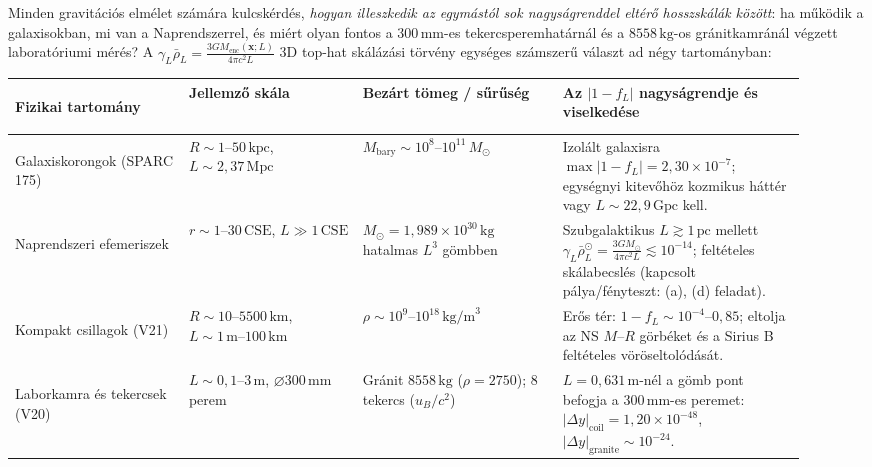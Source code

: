 \documentclass[10pt,a4paper]{article}
\begin{document}
\par
Minden gravit\'aci\'os elm\'elet sz\'am\'ara kulcsk\'erd\'es, \emph{hogyan illeszkedik az egym\'ast\'ol sok nagys\'agrenddel elt\'er\H{o} hosszsk\'al\'ak k\"oz\"ott}: ha m\H{u}k\"odik a galaxisokban, mi van a Naprendszerrel, \'es mi\'ert olyan fontos a $300\,\text{mm}$-es tekercsperemhat\'arn\'al \'es a $8558\,\text{kg}$-os gr\'anitkamr\'an\'al v\'egzett laborat\'oriumi m\'er\'es? A $\gamma_L \bar{\rho}_L = \frac{3 G M_{\text{enc}}(\mathbf{x};L)}{4\pi c^2 L}$ 3D top-hat sk\'al\'az\'asi t\"orv\'eny egys\'eges sz\'amszer\H{u} v\'alaszt ad n\'egy tartom\'anyban:
\begin{center}\vspace{-2pt}
{\footnotesize
\begin{tabular}{@{}>{\bfseries\raggedright\arraybackslash}p{0.20\linewidth}>{\raggedright\arraybackslash}p{0.20\linewidth}>{\raggedright\arraybackslash}p{0.23\linewidth}>{\raggedright\arraybackslash}p{0.29\linewidth}@{}}
\toprule
Fizikai tartom\'any & Jellemz\H{o} sk\'ala & Bez\'art t\"omeg / s\H{u}r\H{u}s\'eg & Az $|1 - f_L|$ nagys\'agrendje \'es viselked\'ese \\
\midrule
Galaxiskorongok (SPARC 175) & $R \sim 1\text{--}50\,\text{kpc}$, $L \sim 2{,}37\,\text{Mpc}$ & $M_{\text{bary}} \sim 10^8\text{--}10^{11}\,M_\odot$ & Izol\'alt galaxisra $\max|1-f_L| = 2{,}30\times 10^{-7}$; egys\'egnyi kitev\H{o}h\"oz kozmikus h\'att\'er vagy $L\sim 22{,}9\,\text{Gpc}$ kell. \\
Naprendszeri efemeriszek & $r \sim 1\text{--}30\,\text{CSE}$, $L \gg 1\,\text{CSE}$ & $M_\odot = 1{,}989\times 10^{30}\,\text{kg}$ hatalmas $L^3$ g\"ombben & Szubgalaktikus $L \gtrsim 1\,\text{pc}$ mellett $\gamma_L\bar{\rho}_L^\odot = \frac{3GM_\odot}{4\pi c^2 L} \lesssim 10^{-14}$; felt\'eteles sk\'alabecsl\'es (kapcsolt p\'alya/f\'enyteszt: (a), (d) feladat). \\
Kompakt csillagok (V21) & $R \sim 10\text{--}5500\,\text{km}$, $L \sim 1\,\text{m}\text{--}100\,\text{km}$ & $\rho \sim 10^9\text{--}10^{18}\,\text{kg/m}^3$ & Er\H{o}s t\'er: $1-f_L \sim 10^{-4}\text{--}0{,}85$; eltolja az NS $M$--$R$ g\"orb\'eket \'es a Sirius B felt\'eteles v\"or\"oseltol\'od\'as\'at. \\
Laborkamra \'es tekercsek (V20) & $L \sim 0{,}1\text{--}3\,\text{m}$, $\varnothing 300\,\text{mm}$ perem & Gr\'anit $8558\,\text{kg}$ ($\rho=2750$); 8 tekercs ($u_B/c^2$) & $L=0{,}631\,\text{m}$-n\'el a g\"omb pont befogja a $300\,\text{mm}$-es peremet: $|\Delta y|_{\text{coil}}=1{,}20\times 10^{-48}$, $|\Delta y|_{\text{granite}}\sim 10^{-24}$. \\
\bottomrule
\end{tabular}}
\end{center}
\end{document}
